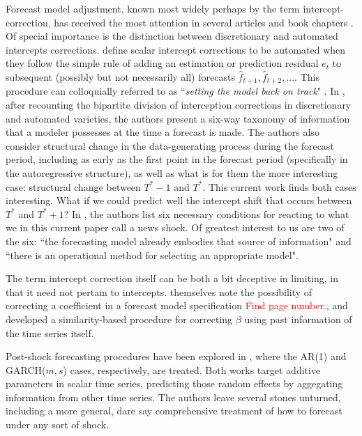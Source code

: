 \documentclass[11pt]{article}
\theoremstyle{definition}
\begin{document}
Forecast model adjustment, known most widely perhaps by the term intercept-correction, has received the most attention in several articles and book chapters \citep{hendry1994theory,clements1996intercept,clements1998forecasting}.  Of special importance is the distinction between discretionary and automated intercepts corrections. \cite{hendry1994theory} define scalar intercept corrections to be automated when they follow the simple rule of adding an estimation or prediction residual $e_{t}$ to subsequent (possibly but not necessarily all) forecasts $\hat f_{t+1},\hat f_{t+2},...$.  This procedure can colloquially referred to as ``\textit{setting the model back on track}" \citep{hendry1994theory}.  In \cite{hendry1994theory}, after recounting the bipartite division of interception corrections in discretionary and automated varieties, the authors present a six-way taxonomy of information that a modeler possesses at the time a forecast is made.  The authors also consider structural change in the data-generating process during the forecast period, including as early as the first point in the forecast period (specifically in the autoregressive structure), as well as what is for them the more interesting case: structural change between $T^{*}-1$ and $T^{*}$.  This current work finds both cases interesting.  What if we could predict well the intercept shift that occurs between $T^{*}$ and $T^{*}+1$?  In \cite{castle2016overview}, the authors list six necessary conditions for reacting to what we in this current paper call a news shock.  Of greatest interest to us are two of the six: ``the forecasting model already
embodies that source of information" and ``there is an operational method for selecting
an appropriate model".  

The term intercept correction itself can be both a bit deceptive in limiting, in that it need not pertain to intercepts.  \cite{hendry1994theory} themselves note the possibility of correcting a coefficient in a forecast model specification \textcolor{red}{Find page number.}, and \cite{guerron2017macroeconomic} developed a similarity-based procedure for correcting $\beta$ using past information of the time series itself.

Post-shock forecasting procedures have been explored in \cite{lin2021minimizing,lundquist2024volatility}, where the AR(1) and GARCH($m,s$) cases, respectively, are treated.  Both works target additive parameters in scalar time series, predicting those random effects by aggegating information from other time series.  The authors leave several stones unturned, including a more general, dare say comprehensive treatment of how to forecast under any sort of shock.
\end{document}
